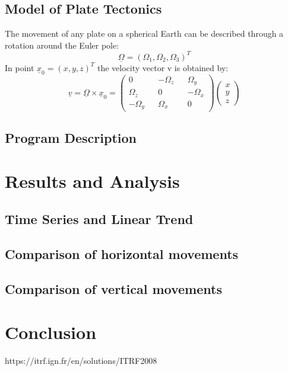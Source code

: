 \documentclass{article}
\begin{document}
\subsection{Model of Plate Tectonics}
The movement of any plate on a spherical Earth can be described through a rotation around the Euler pole:
$$\underline{\Omega}=(\Omega_{1},\Omega_{2},\Omega_{3})^{T}$$
In point $\underline{x}_{0}=(x,y,z)^{T}$ the velocity vector v is obtained by:
$$\underline{v}=\underline{\Omega}\times\underline{x}_0=\begin{pmatrix}0&&-\Omega_z&&\Omega_y\\\Omega_z&&0&&-\Omega_x\\-\Omega_y&&\Omega_x&&0\end{pmatrix}\begin{pmatrix}x\\y\\z\end{pmatrix}$$

\subsection{Program Description}

\section{Results and Analysis}
\subsection{Time Series and Linear Trend}

\subsection{Comparison of horizontal movements}

\subsection{Comparison of vertical movements}

\section{Conclusion}
\begin{thebibliography}{99}
    https://itrf.ign.fr/en/solutions/ITRF2008
    
\end{thebibliography}
\end{document}
